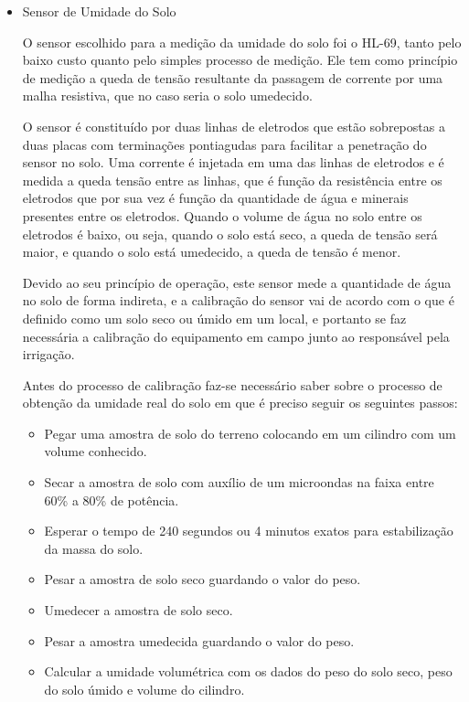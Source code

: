 \begin{itemize}
  \item Sensor de Umidade do Solo

  O sensor escolhido para a medição da umidade do solo foi o HL-69,
  tanto pelo baixo custo quanto pelo simples processo de medição.
  Ele tem como princípio de medição a queda de tensão resultante da
  passagem de corrente por uma malha resistiva, que no caso seria o solo
  umedecido.

  O sensor é constituído por duas linhas de eletrodos que estão
  sobrepostas a duas placas com terminações pontiagudas para facilitar a
  penetração do sensor no solo. Uma corrente é injetada em uma das linhas
  de eletrodos e é medida a queda tensão entre as linhas, que é função da
  resistência entre os eletrodos que por sua vez é função da quantidade de
  água e minerais presentes entre os eletrodos. Quando o volume de água no
   solo entre os eletrodos é baixo, ou seja, quando o solo está seco,
   a queda de tensão será maior, e quando o solo está umedecido,
   a queda de tensão é menor.

  Devido ao seu princípio de operação, este sensor mede a quantidade de
  água no solo de forma indireta, e a calibração do sensor vai de acordo
  com o que é definido como um solo seco ou úmido em um local, e portanto
  se faz necessária a calibração do equipamento em campo junto ao
  responsável pela irrigação.
  
  Antes do processo de calibração faz-se necessário saber sobre o processo de obtenção da umidade real do solo em que é preciso seguir os seguintes passos:
  
  \begin{itemize}
  	\item Pegar uma amostra de solo do terreno colocando em um cilindro com um volume conhecido.
  	\item Secar a amostra de solo com auxílio de um microondas na faixa entre 60\% a 80\% de potência.
  	\item Esperar o tempo de 240 segundos ou 4 minutos exatos para estabilização da massa do solo.
  	\item Pesar a amostra de solo seco guardando o valor do peso.
  	\item Umedecer a amostra de solo seco.
  	\item Pesar a amostra umedecida guardando o valor do peso.
  	\item Calcular a umidade volumétrica com os dados do peso do solo seco, peso do solo úmido e volume do cilindro.
  \end{itemize}
  

\end{itemize}

